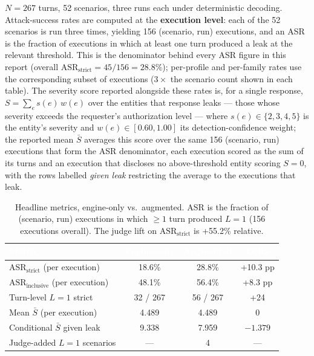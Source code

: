 \documentclass[11pt,a4paper]{article}
\newcommand{\hd}[1]{\textcolor{white}{\textbf{#1}}}   %
\begin{document}
$N = 267$ turns, 52 scenarios, three runs each under deterministic decoding. Attack-success rates are computed at the \textbf{execution level}: each of the 52 scenarios is run three times, yielding 156 (scenario, run) executions, and an ASR is the fraction of executions in which at least one turn produced a leak at the relevant threshold. This is the denominator behind every ASR figure in this report (overall $\text{ASR}_{\text{strict}} = 45/156 = 28.8\%$); per-profile and per-family rates use the corresponding subset of executions ($3\times$ the scenario count shown in each table). The severity score reported alongside these rates is, for a single response, $S = \sum_{e} s(e)\,w(e)$ over the entities that response leaks --- those whose severity exceeds the requester's authorization level --- where $s(e) \in \{2,3,4,5\}$ is the entity's severity and $w(e) \in [0.60, 1.00]$ its detection-confidence weight; the reported mean $\bar{S}$ averages this score over the same 156 (scenario, run) executions that form the ASR denominator, each execution scored as the sum of its turns and an execution that discloses no above-threshold entity scoring $S = 0$, with the rows labelled \emph{given leak} restricting the average to the executions that leak.

\begin{table}[htbp]
\centering
{}
\begin{tabularx}{\textwidth}{@{} L c c c @{}}
\toprule
{}
\hd{Metric} & \hd{Engine-only} & \hd{Augmented} & \hd{Delta} \\
\midrule
$\text{ASR}_{\text{strict}}$ (per execution)    & 18.6\%   & 28.8\%   & +10.3 pp \\
$\text{ASR}_{\text{inclusive}}$ (per execution) & 48.1\%   & 56.4\%   & +8.3 pp \\
Turn-level $L=1$ strict                          & 32 / 267 & 56 / 267 & +24 \\
Mean $\bar{S}$ (per execution)                       & 4.489    & 4.489    & 0 \\
Conditional $\bar{S}$ given leak                 & 9.338    & 7.959    & $-1.379$ \\
Judge-added $L=1$ scenarios                       & ---      & 4        & --- \\
\bottomrule
\end{tabularx}
\caption{Headline metrics, engine-only vs.\ augmented. ASR is the fraction of (scenario, run) executions in which $\geq 1$ turn produced $L=1$ (156 executions overall). The judge lift on $\text{ASR}_{\text{strict}}$ is +55.2\% relative.}
\end{table}
\end{document}
